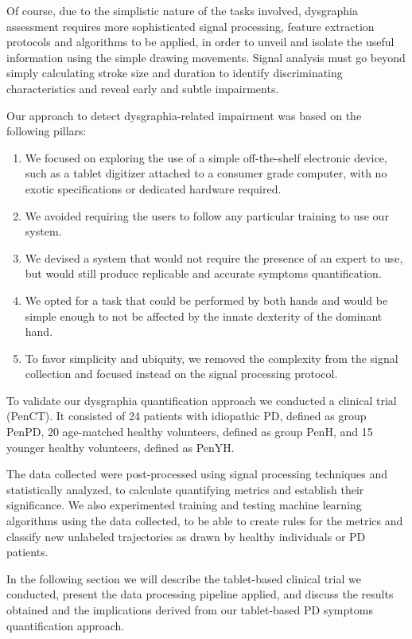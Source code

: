 Of course, due to the simplistic nature of the tasks involved, dysgraphia assessment requires more sophisticated signal processing, feature extraction protocols and algorithms to be applied, in order to unveil and isolate the useful information using the simple drawing movements. Signal analysis must go beyond simply calculating stroke size and duration to identify discriminating characteristics and reveal early and subtle impairments.

Our approach to detect dysgraphia-related impairment was based on the following pillars: 

\begin{enumerate}
\item We focused on exploring the use of a simple off-the-shelf electronic device, such as a tablet digitizer attached to a consumer grade computer, with no exotic specifications or dedicated hardware required.  
\item We avoided requiring the users to follow any particular training to use our system. 
\item We devised a system that would not require the presence of an expert to use, but would still produce replicable and accurate symptoms quantification. 
\item We opted for a task that could be performed by both hands and would be simple enough to not be affected by the innate dexterity of the dominant hand.
\item To favor simplicity and ubiquity, we removed the complexity from the signal collection and focused instead on the signal processing protocol.  
\end{enumerate}
\noindent
To validate our dysgraphia quantification approach we conducted a clinical trial (\gls{PenCT}). It consisted of 24 patients with idiopathic \gls{PD}, defined as group \gls{PenPD}, 20 age-matched healthy volunteers, defined as group \gls{PenH}, and 15 younger healthy volunteers, defined as \gls{PenYH}.

The data collected were post-processed using signal processing techniques and statistically analyzed, to calculate quantifying metrics and establish their significance. We also experimented training and testing machine learning algorithms using the data collected, to be able to create rules for the metrics and classify new unlabeled trajectories as drawn by healthy individuals or \gls{PD} patients. 

In the following section we will describe the tablet-based clinical trial we conducted, present the data processing pipeline applied, and discuss the results obtained and the implications derived from our tablet-based \gls{PD} symptoms quantification approach. 


